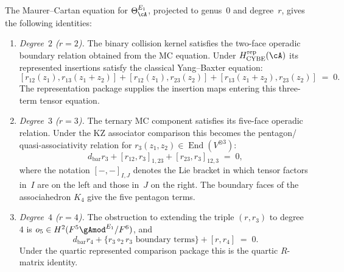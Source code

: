 \begin{theorem}
\label{thm:e1-mc-finite-degree}
The Maurer--Cartan equation for $\Theta_\cA^{E_1}$, projected to
genus~$0$ and degree~$r$, gives the following identities:
\begin{enumerate}[label=\textup{(\roman*)}]
\item \emph{Degree~$2$ \textup{(}$r = 2$\textup{)}.}
 The binary collision kernel satisfies the two-face operadic boundary
 relation obtained from the MC equation.  Under
 $H_{\mathrm{CYBE}}^{\mathrm{rep}}(\cA)$ its represented insertions
 satisfy the classical Yang--Baxter equation\textup{:}
 \begin{equation}
 \label{eq:e1-mc-degree2}
 [r_{12}(z_1), r_{13}(z_1 + z_2)]
 + [r_{12}(z_1), r_{23}(z_2)]
 + [r_{13}(z_1 + z_2), r_{23}(z_2)]
 \;=\; 0.
 \end{equation}
 The representation package supplies the insertion maps entering this
 three-term tensor equation.
\item \emph{Degree~$3$ \textup{(}$r = 3$\textup{)}.} The ternary MC
 component satisfies its five-face operadic relation.  Under the KZ
 associator comparison this becomes the pentagon\slash
 quasi-associativity relation for
 $r_3(z_1, z_2) \in \operatorname{End}(V^{\otimes 3})$\textup{:}
 \begin{equation}
 \label{eq:e1-mc-degree3}
 d_{\mathrm{bar}} r_3
 + [r_{12}, r_3]_{1,23}
 + [r_{23}, r_3]_{12,3}
 \;=\; 0,
 \end{equation}
 where the notation $[-, -]_{I,J}$ denotes the Lie bracket in
 which tensor factors in~$I$ are on the left and those in~$J$
 on the right. The boundary faces of the associahedron $K_4$
 give the five pentagon terms.
\item \emph{Degree~$4$ \textup{(}$r = 4$\textup{)}.} The obstruction
 to extending the
 triple $(r, r_3)$ to degree~$4$ is
 $o_5 \in H^2(F^5 {\gAmod}^{E_1} / F^6)$, and
 \begin{equation}
 \label{eq:e1-mc-degree4}
 d_{\mathrm{bar}} r_4
 + \bigl\{r_3 \circ_2 r_3 \text{ boundary terms}\bigr\}
 + [r, r_4]
 \;=\; 0.
 \end{equation}
 Under the quartic represented comparison package this is the quartic
 $R$-matrix identity.
\end{enumerate}
\end{theorem}

